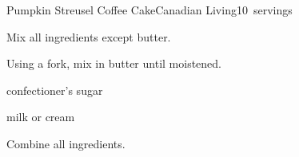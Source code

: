 \begin{recipe}{Pumpkin Streusel Coffee Cake}{Canadian Living}{10~servings}
\begin{directions}
\item Mix all ingredients except butter.
\item Using a fork, mix in butter until moistened.
\end{directions}

\begin{ingredients}
\item \C{\threequarter} confectioner's sugar
\item {} milk or cream
\end{ingredients}

\begin{directions}
\item Combine all ingredients.
\end{directions}

\end{recipe}
